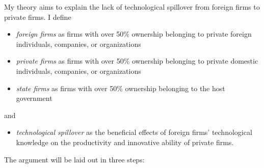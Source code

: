 My theory aims to explain the lack of technological spillover from foreign firms to private firms. I define

\begin{itemize}[nosep]
\item \textit{foreign firms} as firms with over 50\% ownership belonging to private foreign individuals, companies, or organizations
\item \textit{private firms} as firms with over 50\% ownership belonging to private domestic individuals, companies, or organizations
\item \textit{state firms} as firms with over 50\% ownership belonging to the host government
\end{itemize}

and

\begin{itemize}
\item \textit{technological spillover} as the beneficial effects of foreign firms' technological knowledge on the productivity and innovative ability of private firms.
\end{itemize}

The argument will be laid out in three steps:

